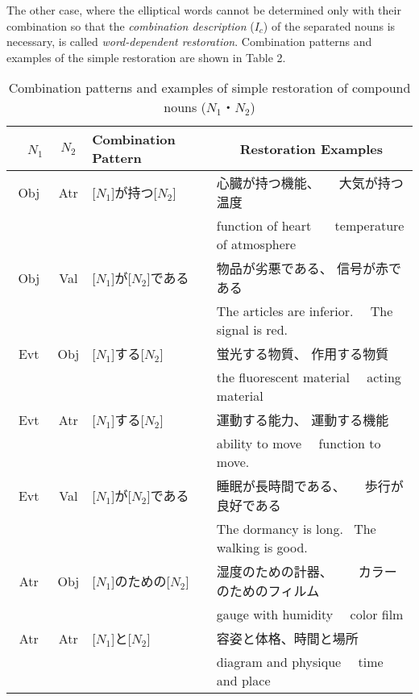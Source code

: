 The other case, where the elliptical words cannot be determined only
with their combination so that the {\it combination description}
($I_c$) of the separated nouns is necessary, is called {\it
word-dependent restoration}. Combination patterns and examples of the
simple restoration are shown in Table 2.
\begin{table}
\begin{center}
\caption{Combination patterns and examples of simple restoration of
compound nouns ($N_1$・$N_2$)}
\begin{tabular}{c|c|l|l} \hline
 　$N_1$　 & $N_2$ & Combination Pattern  & 
\multicolumn{1}{|c}{Restoration Examples}\\ \hline
 Obj & Atr & [$N_1$]が持つ[$N_2$] & 心臓が持つ機能、\ \ \ 大気が持つ温度\\
    &     &                      & function of heart \ \ \ 
temperature of atmosphere\\ 
 Obj & Val & [$N_1$]が[$N_2$]である     & 物品が劣悪である、\hspace{3em}
信号が赤である\\
    &     &                      & The articles are inferior. \ \ 
The signal is red.\\
 Evt & Obj & [$N_1$]する[$N_2$]         & 蛍光する物質、\hspace{4em}
作用する物質\\
     &     &                     & the fluorescent material \ \ acting
material\\
 Evt  & Atr & [$N_1$]する[$N_2$]         & 運動する能力、\hspace{1em}
運動する機能\\
     &     &                      & ability to move \ \ function to move.\\
 Evt  & Val & [$N_1$]が[$N_2$]である     & 睡眠が長時間である、\ \ \ 
歩行が良好である\\
     &     &                      & The dormancy is long. \ 
The walking is good.\\
 Atr  & Obj & [$N_1$]のための[$N_2$]     & 湿度のための計器、\ \ \ \
カラーのためのフィルム\\
     &     &                      & gauge with humidity \ \ color film\\
 Atr  & Atr & [$N_1$]と[$N_2$]     & 容姿と体格、\hspace{5em}時間と場所\\
     &     &                      & diagram and physique \ \ 
time and place\\

\end{tabular}
\end{center}
\end{table}
